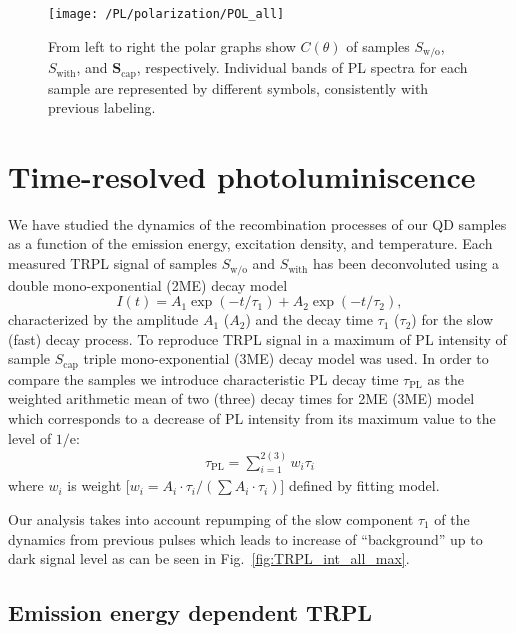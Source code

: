 \begin{figure}
	\centering
	\texttt{[image: /PL/polarization/POL\_all]}
	\caption{From left to right the polar graphs show $C(\theta)$ of samples ${S_\mathrm{w/o}}$, ${S_\mathrm{with}}$, and $\mathbf{S_\mathrm{cap}}$, respectively. Individual bands of PL spectra for each sample are represented by different symbols, consistently with previous labeling.}
	\label{fig:PL_pol_all}
\end{figure}

\newpage
\section{Time-resolved photoluminiscence}
We have studied the dynamics of the recombination processes of our QD samples as a function of the emission energy, excitation density, and temperature. Each measured TRPL signal of samples $S_\mathrm{w/o}$ and $S_\mathrm{with}$ has been deconvoluted using a double mono-exponential (2ME) decay model
%
\begin{equation}
I(t)=A_1\exp(-t/\tau_1)+A_2\exp(-t/\tau_2),
\end{equation}
 characterized by the amplitude $A_1$ ($A_2$) and the decay time $\tau_1$ ($\tau_2$) for the slow (fast) decay process.
 To reproduce TRPL signal in a maximum of PL intensity of sample $S_\mathrm{cap}$ triple mono-exponential (3ME) decay model was used.
 In order to compare the samples we introduce characteristic PL decay time $\tau_\mathrm{PL}$ as the weighted arithmetic mean of two (three) decay times for 2ME (3ME) model which corresponds to a decrease of PL intensity from its maximum value to the level of $1/\mathrm{e}$:
%
\begin{eqnarray}
\tau_\mathrm{PL}=\sum_{i=1}^{2 ( 3) } w_i\tau_i \label{eq:average_time}
\end{eqnarray}
%
where $w_i$ is weight [$w_i={A_i\cdot \tau_i }/{(\sum A_i \cdot \tau_i)}$] defined by fitting model.

Our analysis takes into account repumping of the slow component $\tau_1$ of the dynamics from previous pulses which leads to increase of \enquote{background} up to dark signal level as can be seen in Fig.~\ref{fig:TRPL_int_all_max}.


\subsection{Emission energy dependent TRPL}
%

